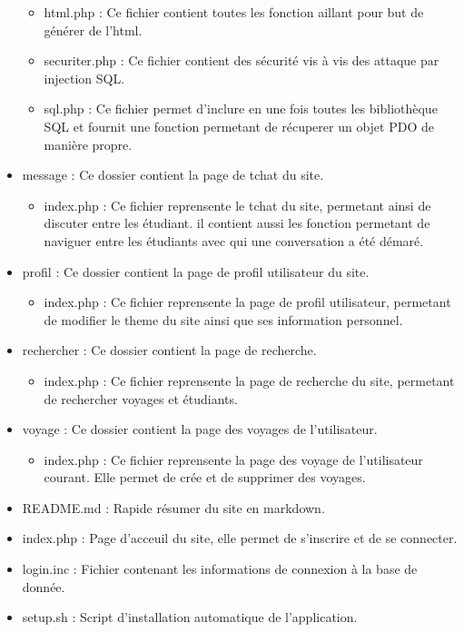 \documentclass[a4paper,10pt]{report}
\begin{document}
\begin{itemize}
\begin{itemize}
        \item html.php : Ce fichier contient toutes les fonction aillant pour but de générer de l'html.
        \item securiter.php : Ce fichier contient des sécurité vis à vis des attaque par injection SQL.
        \item sql.php : Ce fichier permet d'inclure en une fois toutes les bibliothèque SQL et fournit une fonction permetant de
        récuperer un objet PDO de manière propre.
    \end{itemize}
    \item message : Ce dossier contient la page de tchat du site.
    \begin{itemize}
        \item index.php : Ce fichier reprensente le tchat du site, permetant ainsi de discuter entre les étudiant. il contient aussi les fonction permetant de naviguer entre les étudiants avec
        qui une conversation a été démaré.
    \end{itemize}
    \item profil : Ce dossier contient la page de profil utilisateur du site.
    \begin{itemize}
         \item index.php : Ce fichier reprensente la page de profil utilisateur, permetant de modifier le theme du site ainsi que ses information personnel.
    \end{itemize}
    \item rechercher : Ce dossier contient la page de recherche.
    \begin{itemize}
        \item index.php : Ce fichier reprensente la page de recherche du site, permetant de rechercher voyages et étudiants.
    \end{itemize}
    \item voyage : Ce dossier contient la page des voyages de l'utilisateur.
    \begin{itemize}
        \item index.php : Ce fichier reprensente la page des voyage de l'utilisateur courant. Elle permet de crée et de supprimer des voyages.
    \end{itemize}
    \item README.md : Rapide résumer du site en markdown.
    \item index.php : Page d'acceuil du site, elle permet de s'inscrire et de se connecter.
    \item login.inc : Fichier contenant les informations de connexion à la base de donnée.
    \item setup.sh : Script d'installation automatique de l'application.
\end{itemize}
\end{document}

